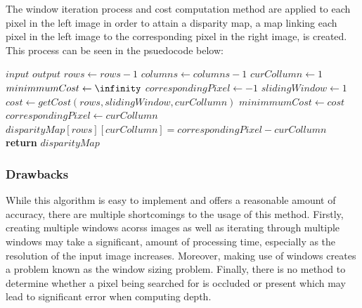 \documentclass[11pt]{scrartcl}
\begin{document}
The window iteration process and cost computation method are applied to each pixel in the 
left image in order to attain a disparity map, a map linking each pixel in the left image 
to the corresponding pixel in the right image, is created. This process can be seen in the 
psuedocode below:
\\
\begin{algorithm}[!htb]
    \algrenewcommand{}
    \algrenewcommand{}
    \caption{}
    \label{alg:}
    \begin{algorithmic}[1]
        \Require $input$
        \Ensure $output$ 
        \State $rows \gets rows-1$
        \State $columns \gets columns-1$
            \State $curCollumn \gets 1$
                \State $minimmumCost \gets \infinity$
                \State $correspondingPixel \gets -1$
                \State $slidingWindow \gets 1$
                      \State $cost \gets getCost(rows, slidingWindow, curCollumn)$
                         \State $minimmumCost \gets cost$
                         \State $correspondingPixel \gets curCollumn$
                      \EndIf
                \EndWhile
            \EndWhile 
            \State $disparityMap[rows][curCollumn] = correspondingPixel - curCollumn$
        \EndWhile
        \State \textbf{return} $disparityMap$
    \end{algorithmic}
\end{algorithm}

\subsubsection{Drawbacks}
While this algorithm is easy to implement and offers a reasonable amount of accuracy, there 
are multiple shortcomings to the usage of this method. Firstly, creating multiple windows 
acorss images as well as iterating through multiple windows may take a significant, 
amount of processing time, especially as the resolution of the input image increases. 
Moreover, making use of windows creates a problem 
known as the window sizing problem.  Finally, there is no method to 
determine whether a pixel being searched for is occluded or present which may lead to 
significant error when computing depth. 
\end{document}
